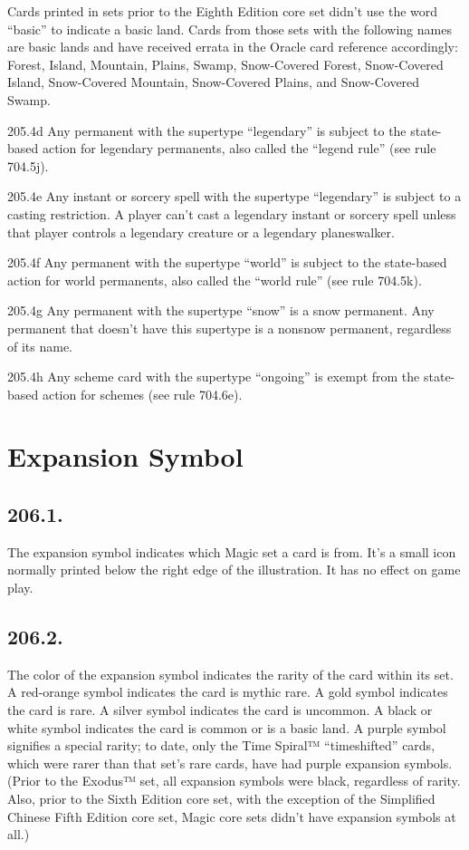 Cards printed in sets prior to the Eighth Edition core set didn’t use the word “basic” to indicate a basic land. Cards from those sets with the following names are basic lands and have received errata in the Oracle card reference accordingly: Forest, Island, Mountain, Plains, Swamp, Snow-Covered Forest, Snow-Covered Island, Snow-Covered Mountain, Snow-Covered Plains, and Snow-Covered Swamp.

205.4d Any permanent with the supertype “legendary” is subject to the state-based action for legendary permanents, also called the “legend rule” (see rule 704.5j).

205.4e Any instant or sorcery spell with the supertype “legendary” is subject to a casting restriction. A player can’t cast a legendary instant or sorcery spell unless that player controls a legendary creature or a legendary planeswalker.

205.4f Any permanent with the supertype “world” is subject to the state-based action for world permanents, also called the “world rule” (see rule 704.5k).

205.4g Any permanent with the supertype “snow” is a snow permanent. Any permanent that doesn’t have this supertype is a nonsnow permanent, regardless of its name.

205.4h Any scheme card with the supertype “ongoing” is exempt from the state-based action for schemes (see rule 704.6e).

\section{Expansion Symbol}
\subsection*{206.1.}
The expansion symbol indicates which Magic set a card is from. It’s a small icon normally printed below the right edge of the illustration. It has no effect on game play.

\subsection*{206.2.}
The color of the expansion symbol indicates the rarity of the card within its set. A red-orange symbol indicates the card is mythic rare. A gold symbol indicates the card is rare. A silver symbol indicates the card is uncommon. A black or white symbol indicates the card is common or is a basic land. A purple symbol signifies a special rarity; to date, only the Time Spiral™ “timeshifted” cards, which were rarer than that set’s rare cards, have had purple expansion symbols. (Prior to the Exodus™ set, all expansion symbols were black, regardless of rarity. Also, prior to the Sixth Edition core set, with the exception of the Simplified Chinese Fifth Edition core set, Magic core sets didn’t have expansion symbols at all.)

